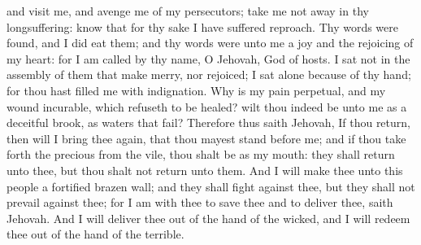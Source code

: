and visit me, and avenge me of my persecutors; take me not away in thy longsuffering: know that for thy sake I have suffered reproach. Thy words were found, and I did eat them; and thy words were unto me a joy and the rejoicing of my heart: for I am called by thy name, O Jehovah, God of hosts. I sat not in the assembly of them that make merry, nor rejoiced; I sat alone because of thy hand; for thou hast filled me with indignation. Why is my pain perpetual, and my wound incurable, which refuseth to be healed? wilt thou indeed be unto me as a deceitful brook, as waters that fail?  Therefore thus saith Jehovah, If thou return, then will I bring thee again, that thou mayest stand before me; and if thou take forth the precious from the vile, thou shalt be as my mouth: they shall return unto thee, but thou shalt not return unto them. And I will make thee unto this people a fortified brazen wall; and they shall fight against thee, but they shall not prevail against thee; for I am with thee to save thee and to deliver thee, saith Jehovah. And I will deliver thee out of the hand of the wicked, and I will redeem thee out of the hand of the terrible. 

